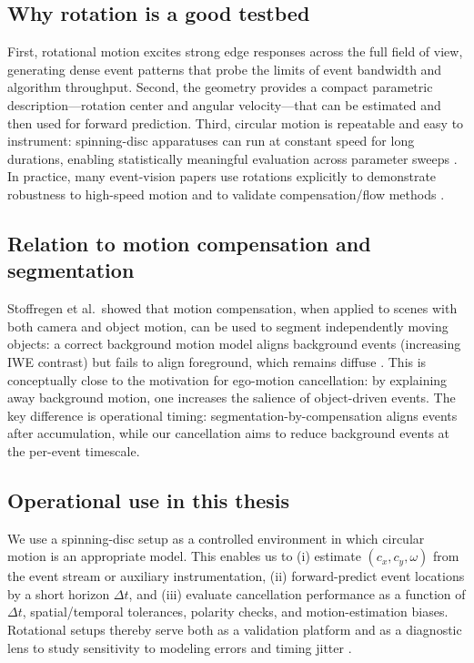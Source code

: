 \subsection{Why rotation is a good testbed}
First, rotational motion excites strong edge responses across the full field of view, generating dense event patterns that probe the limits of event bandwidth and algorithm throughput. Second, the geometry provides a compact parametric description—rotation center and angular velocity—that can be estimated and then used for forward prediction. Third, circular motion is repeatable and easy to instrument: spinning-disc apparatuses can run at constant speed for long durations, enabling statistically meaningful evaluation across parameter sweeps \cite{Stoffregen2019Segmentation}. In practice, many event-vision papers use rotations explicitly to demonstrate robustness to high-speed motion and to validate compensation/flow methods \cite{Gallego2018CMax}.

\subsection{Relation to motion compensation and segmentation}
Stoffregen et al.\ showed that motion compensation, when applied to scenes with both camera and object motion, can be used to segment independently moving objects: a correct background motion model aligns background events (increasing IWE contrast) but fails to align foreground, which remains diffuse \cite{Stoffregen2019Segmentation}. This is conceptually close to the motivation for ego-motion cancellation: by explaining away background motion, one increases the salience of object-driven events. The key difference is operational timing: segmentation-by-compensation aligns events after accumulation, while our cancellation aims to reduce background events at the per-event timescale.

\subsection{Operational use in this thesis}
We use a spinning-disc setup as a controlled environment in which circular motion is an appropriate model. This enables us to (i) estimate $(c_x,c_y,\omega)$ from the event stream or auxiliary instrumentation, (ii) forward-predict event locations by a short horizon $\Delta t$, and (iii) evaluate cancellation performance as a function of $\Delta t$, spatial/temporal tolerances, polarity checks, and motion-estimation biases. Rotational setups thereby serve both as a validation platform and as a diagnostic lens to study sensitivity to modeling errors and timing jitter \cite{Gallego2017Angular,Gallego2018CMax}.

